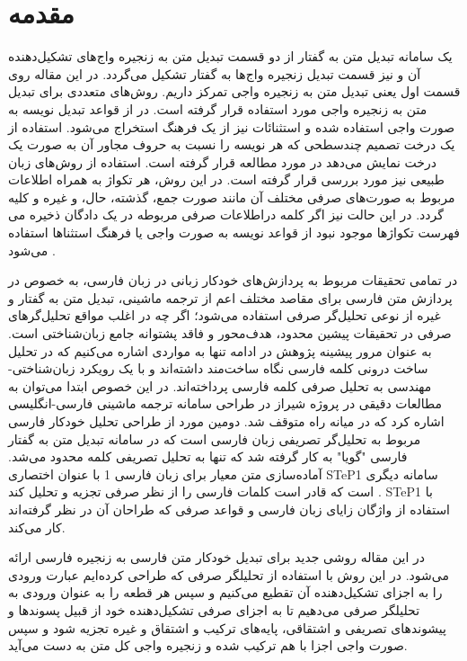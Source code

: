 \documentclass[12pt,onecolumn,a4paper]{article}
\begin{document}
    \section{مقدمه}
    یک سامانه تبدیل متن به گفتار از دو قسمت تبدیل متن به زنجیره واج‌های تشکیل‌دهنده آن و نیز قسمت تبدیل زنجیره واج‌ها به گفتار تشکیل می‌گردد. در این مقاله روی قسمت اول یعنی تبدیل متن به زنجیره واجی تمرکز داریم. روش‌های متعددی برای تبدیل متن به زنجیره واجی مورد استفاده قرار گرفته است. در  از قواعد تبدیل نویسه به صورت واجی استفاده شده و استثنائات نیز از یک فرهنگ استخراج می‌شود. استفاده از یک درخت تصمیم چندسطحی که هر نویسه را نسبت به حروف مجاور آن به صورت یک درخت نمایش می‌دهد در  مورد مطالعه قرار گرفته است. استفاده از روش‌های زبان طبیعی نیز مورد بررسی قرار گرفته است. در این روش، هر تکواژ به همراه اطلاعات مربوط به صورت‌های صرفی مختلف آن مانند صورت جمع، گذشته، حال، و غیره و کلیه اطلاعات صرفی مربوطه در یک دادگان ذخیره می‎‌گردد. در این حالت نیز اگر کلمه در فهرست تکواژها موجود نبود از قواعد نویسه به صورت واجی یا فرهنگ استثناها استفاده می‌شود {\mfo\citep{sayad_75}}.
    \par
    در تمامی تحقیقات مربوط به پردازش‌های خودکار زبانی در زبان فارسی، به خصوص در پردازش متن فارسی برای مقاصد مختلف اعم از ترجمه ماشینی، تبدیل متن به گفتار و غیره از نوعی تحلیل‌گر صرفی استفاده می‌شود؛ اگر چه در اغلب مواقع تحلیل‌گرهای صرفی در تحقیقات پیشین محدود، هدف‌محور و فاقد پشتوانه جامع زبان‌شناختی است. به عنوان مرور پیشینه پژوهش در ادامه تنها به مواردی اشاره می‌کنیم که در تحلیل ساخت درونی کلمه فارسی نگاه ساخت‌مند داشته‌اند و با یک رویکرد زبان‌شناختی- مهندسی به تحلیل صرفی کلمه فارسی پرداخته‌اند. در این خصوص ابتدا می‌توان به مطالعات دقیقی در پروژه شیراز     
    در طراحی سامانه ترجمه ماشینی فارسی-انگلیسی اشاره کرد که در میانه راه متوقف شد. دومین مورد از طراحی تحلیل خودکار فارسی مربوط به تحلیل‌گر تصریفی زبان فارسی است که در سامانه تبدیل متن به گفتار فارسی "گویا" به کار گرفته شد {\mfo\citep{eslami_83a}} که تنها به تحلیل تصریفی کلمه محدود می‌شد. آماده‌سازی متن معیار برای زبان فارسی 1 با عنوان اختصاری STeP1 سامانه دیگری است که قادر است کلمات فارسی را از نظر صرفی تجزیه و تحلیل کند {\mfo\citep{shams_88}}. STeP1 با استفاده از واژگان زایای زبان فارسی {\mfo\citep{eslami_83b}} و قواعد صرفی که طراحان آن در نظر گرفته‌اند کار می‌کند.
    \par
    در این مقاله روشی جدید برای تبدیل خودکار متن فارسی به زنجیره فارسی ارائه می‌شود. در این روش با استفاده از تحلیلگر صرفی که طراحی کرده‌ایم عبارت ورودی را به اجزای تشکیل‌دهنده آن تقطیع می‌کنیم و سپس هر قطعه را به عنوان ورودی به تحلیلگر صرفی می‌دهیم تا به اجزای صرفی تشکیل‌دهنده خود از قبیل پسوندها و پیشوندهای تصریفی و اشتقاقی، پایه‌های ترکیب و اشتقاق و غیره تجزیه شود و سپس صورت واجی اجزا با هم ترکیب شده و زنجیره واجی کل متن به دست می‌آید.
\end{document}
